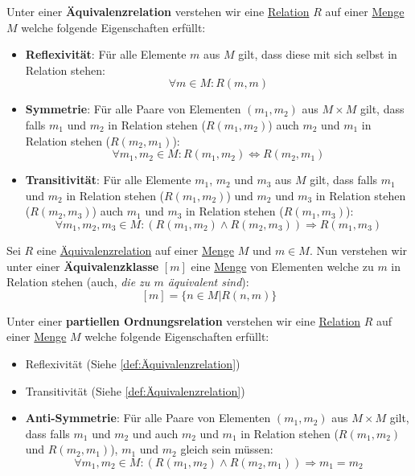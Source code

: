 \documentclass[../../main.tex]{subfiles}
\begin{document}
	\begin{definition}[Äquivalenzrelation]
		\label{def:Äquivalenzrelation}
		Unter einer \textbf{Äquivalenzrelation} verstehen wir eine \hyperref[def:Relation]{Relation} $R$ auf einer \hyperref[def:Menge]{Menge} $M$ welche folgende Eigenschaften erfüllt: 
		\begin{itemize}
			\item \textbf{Reflexivität}: Für alle Elemente $m$ aus $M$ gilt, dass diese mit sich selbst in Relation stehen: $$\forall m \in M: R(m,m)$$
			\item \textbf{Symmetrie}: Für alle Paare von Elementen $(m_1, m_2)$ aus $M \times M$ gilt, dass falls $m_1$ und $m_2$ in Relation stehen ($R(m_1,m_2)$) auch $m_2$ und $m_1$ in Relation stehen ($R(m_2, m_1)$): $$\forall m_1, m_2 \in M: R(m_1,m_2) \Leftrightarrow R(m_2, m_1)$$
			\item \textbf{Transitivität}: Für alle Elemente $m_1$, $m_2$ und $m_3$ aus $M$ gilt, dass falls $m_1$ und $m_2$ in Relation stehen ($R(m_1, m_2)$) und $m_2$ und $m_3$ in Relation stehen ($R(m_2,m_3)$) auch $m_1$ und $m_3$ in Relation stehen ($R(m_1, m_3)$): $$\forall m_1, m_2, m_3 \in M: (R(m_1,m_2) \land R(m_2,m_3)  ) \Rightarrow R(m_1,m_3) $$
		\end{itemize}
	\end{definition}

	\begin{definition}[Äquivalenzklasse]
		Sei $R$ eine \hyperref[def:Äquivalenzrelation]{Äquivalenzrelation} auf einer \hyperref[def:Menge]{Menge} $M$ und $m \in M$. Nun verstehen wir unter einer \textbf{Äquivalenzklasse} $[m]$ eine \hyperref[def:Menge]{Menge} von Elementen welche zu $m$ in Relation stehen (auch, \textit{die zu $m$ äquivalent sind}): $$[m]=\{n \in M | R(n,m)\}$$
	\end{definition}

	\begin{definition}
		\label{def:partielleOrdnungsrelation}
		Unter einer \textbf{partiellen Ordnungsrelation} verstehen wir eine \hyperref[def:Relation]{Relation} $R$ auf einer \hyperref[def:Menge]{Menge} $M$ welche folgende Eigenschaften erfüllt:
		\begin{itemize}
			\item Reflexivität (Siehe \ref{def:Äquivalenzrelation})
			\item Transitivität (Siehe \ref{def:Äquivalenzrelation})
			\item \textbf{Anti-Symmetrie}: Für alle Paare von Elementen $(m_1, m_2)$ aus $M \times M$ gilt, dass falls $m_1$ und $m_2$ und auch $m_2$ und $m_1$ in Relation stehen ($R(m_1,m_2)$ und $R(m_2, m_1)$), $m_1$ und $m_2$ gleich sein müssen: $$\forall m_1, m_2 \in M: (R(m_1,m_2) \land R(m_2, m_1)) \Rightarrow m_1 = m_2$$
		\end{itemize}
	\end{definition}
\end{document}
